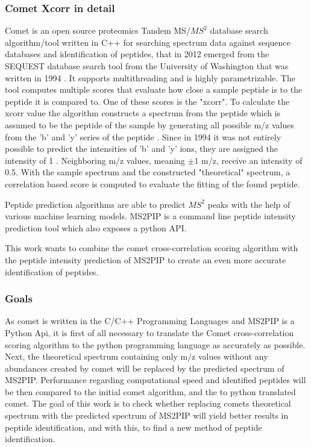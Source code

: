 \documentclass[11pt]{article}
\begin{document}
\subsubsection{Comet Xcorr in detail}
Comet is an open source proteomics Tandem MS/\(MS^2\) database search algorithm/tool written in C++ for searching spectrum data against sequence databases and identification of peptides, that in 2012 emerged from the SEQUEST database search tool from the University of Washington that was written in 1994 \cite{comet-search-tool}. It supports multithreading and is highly parametrizable. The tool computes multiple scores that evaluate how close a sample peptide is to the peptide it is compared to. One of these scores is the "xcorr". To calculate the xcorr value the algorithm constructs a spectrum from the peptide which is assumed to be the peptide of the sample by generating all possible m/z values from the 'b' and 'y' series of the peptide \cite{comet-first-paper}. Since in 1994 it was not entirely possible to predict the intensities of 'b' and 'y' ions, they are assigned the intensity of 1 \cite{deeper-look-into-comet}. Neighboring m/z values, meaning $\pm$1 m/z, receive an intensity of 0.5. With the sample spectrum and the constructed "theoretical" spectrum, a correlation based score is computed
to evaluate the fitting of the found peptide.

Peptide prediction algorithms are able to predict \(MS^2\) peaks with the help of various machine learning models.
MS2PIP\cite{ms2pip} is a command line peptide intensity prediction tool which also exposes a python API.

This work wants to combine the comet cross-correlation scoring algorithm
with the peptide intensity prediction of MS2PIP to create an even more accurate identification of peptides.


\subsubsection{Goals}
As comet is written in the C/C++ Programming Languages and MS2PIP is a Python Api, it is first of all necessary to translate the Comet cross-correlation scoring algorithm to the python programming language as accurately as possible. Next, the theoretical spectrum containing only m/z values without any abundances created by comet will be replaced by the predicted spectrum of MS2PIP. Performance regarding computational speed and identified peptides will be then compared to the initial comet algorithm, and the to python translated comet.
The goal of this work is to check whether replacing comets theoretical spectrum with the predicted spectrum of MS2PIP will yield better results in peptide identification, and with this, to find a new method of peptide identification.
\end{document}
